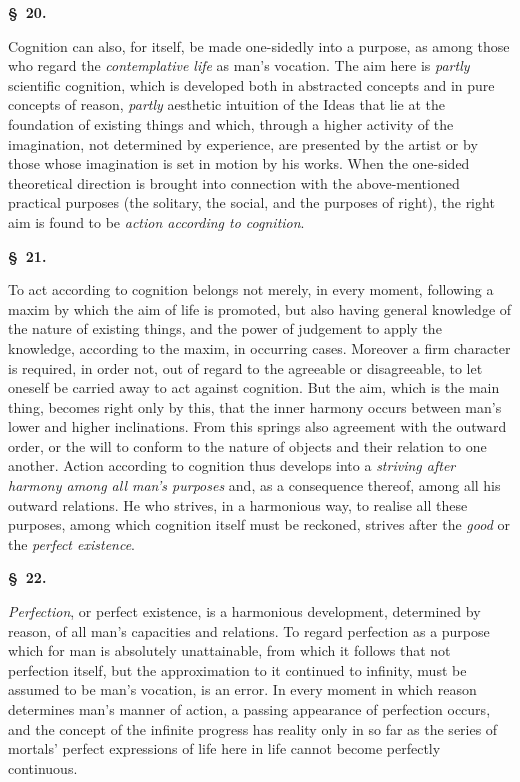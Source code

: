 \documentclass[12pt]{article}
\newcommand{\opage}[1]{\marginnote{\footnotesize\textit{[#1]}}}
\newcommand{\slaw}[1]{\par\medskip\begin{center}\textbf{\S~#1.}\end{center}\nopagebreak}
\begin{document}
\slaw{20}
Cognition can also, for itself, be made one-sidedly into a purpose, as among those who regard the \emph{contemplative life} as man's vocation. The aim here is \emph{partly} scientific cognition, which is developed both in abstracted concepts and in pure concepts of reason, \emph{partly} aesthetic intuition of the Ideas that lie at the foundation of existing things and which, through a higher activity of the imagination, not determined by experience, are presented by the artist or by those whose imagination is set in motion by his works. When the one-sided theoretical direction is brought into connection with the above-mentioned practical purposes (the solitary, \opage{152}the social, and the purposes of right), the right aim is found to be \emph{action according to cognition}.

\slaw{21}
To act according to cognition belongs not merely, in every moment, following a maxim by which the aim of life is promoted, but also having general knowledge of the nature of existing things, and the power of judgement to apply the knowledge, according to the maxim, in occurring cases. Moreover a firm character is required, in order not, out of regard to the agreeable or disagreeable, to let oneself be carried away to act against cognition. But the aim, which is the main thing, becomes right only by this, that the inner harmony occurs between man's lower and higher inclinations. From this springs also agreement with the outward order, or the will to conform to the nature of objects and their relation to one another. Action according to cognition thus develops into a \emph{striving after harmony among all man's purposes} and, as a consequence thereof, among all his outward relations. He who strives, in a harmonious way, to realise all these purposes, among which cognition itself must be reckoned, strives after the \emph{good} or the \emph{perfect existence}.

\slaw{22}
\emph{Perfection}, or perfect existence, is a harmonious development, determined by reason, of all man's capacities and relations. To regard perfection as a purpose which for man is absolutely unattainable, from which it follows that not perfection itself, but the approximation to it continued to infinity, must be assumed to be man's vocation, is an error. In every moment in which reason determines man's manner of action, a passing appearance of perfection occurs, and the concept of the infinite progress has reality only in so far \opage{153}as the series of mortals' perfect expressions of life here in life cannot become perfectly continuous.
\end{document}
